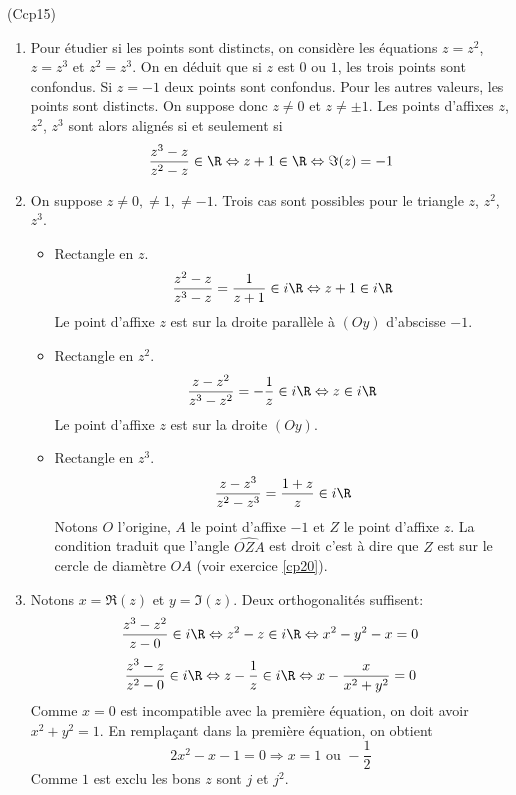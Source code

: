 \begin{tiny}(Ccp15)\end{tiny} \label{Ccp15}
\begin{enumerate}
  \item Pour étudier si les points sont distincts, on considère les équations $z=z^2$, $z=z^3$ et $z^2=z^3$. On en déduit que si $z$ est $0$ ou $1$, les trois points sont confondus. Si $z=-1$ deux points sont confondus. Pour les autres valeurs, les points sont distincts.\newline
On suppose donc $z\neq 0$ et $z\neq \pm 1$. Les points d'affixes $z$, $z^2$, $z^3$ sont alors alignés si et seulement si
\begin{displaymath}
  \frac{z^3-z}{z^2-z}\in \R
  \Leftrightarrow z+1\in \R
  \Leftrightarrow \Im(z) = -1
\end{displaymath}

  \item On suppose $z\neq 0, \neq 1, \neq -1$. Trois cas sont possibles pour le triangle $z$, $z^2$, $z^3$.
\begin{itemize}
  \item Rectangle en $z$.
\begin{displaymath}
  \frac{z^2-z}{z^3-z}=\frac{1}{z+1}\in i\R \Leftrightarrow
  z+1 \in i\R
\end{displaymath}
Le point d'affixe $z$ est sur la droite parallèle à $(Oy)$ d'abscisse $-1$.

 \item Rectangle en $z^2$.
\begin{displaymath}
  \frac{z-z^2}{z^3-z^2}=-\frac{1}{z}\in i\R \Leftrightarrow
  z \in i\R
\end{displaymath}
Le point d'affixe $z$ est sur la droite $(Oy)$.

  \item Rectangle en $z^3$.
\begin{displaymath}
  \frac{z-z^3}{z^2-z^3}=\frac{1+z}{z}\in i\R
\end{displaymath}
Notons $O$ l'origine, $A$ le point d'affixe $-1$ et $Z$ le point d'affixe $z$. La condition traduit que l'angle $\widehat{OZA}$ est droit c'est à dire que $Z$ est sur le cercle de diamètre $OA$ (voir exercice \ref{cp20}).
\end{itemize}

  \item Notons $x=\Re(z)$ et $y=\Im(z)$. Deux orthogonalités suffisent:
\begin{displaymath}
\frac{z^3 - z^2}{z - 0} \in i\R \Leftrightarrow z^2-z\in i\R \Leftrightarrow x^2-y^2-x = 0  
\end{displaymath}
\begin{displaymath}
\frac{z^3 - z}{z^2 - 0} \in i\R \Leftrightarrow z-\frac{1}{z}\in i\R \Leftrightarrow x - \frac{x}{x^2+y^2} = 0  
\end{displaymath}
Comme $x=0$ est incompatible avec la première équation, on doit avoir $x^2+y^2=1$. En remplaçant dans la première équation, on obtient
\begin{displaymath}
  2x^2-x-1=0 \Rightarrow x = 1 \text{ ou } -\frac{1}{2}
\end{displaymath}
Comme $1$ est exclu les bons $z$ sont $j$ et $j^2$.
\end{enumerate}
